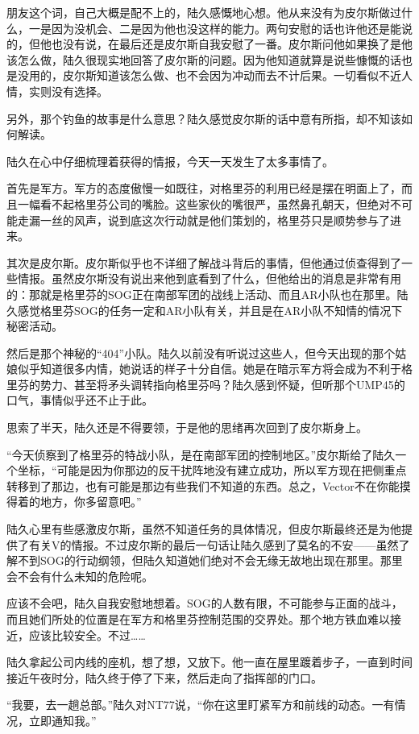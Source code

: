 朋友这个词，自己大概是配不上的，陆久感慨地心想。他从来没有为皮尔斯做过什么，一是因为没机会、二是因为他也没这样的能力。两句安慰的话也许他还是能说的，但他也没有说，在最后还是皮尔斯自我安慰了一番。皮尔斯问他如果换了是他该怎么做，陆久很现实地回答了皮尔斯的问题。因为他知道就算是说些慷慨的话也是没用的，皮尔斯知道该怎么做、也不会因为冲动而去不计后果。一切看似不近人情，实则没有选择。

另外，那个钓鱼的故事是什么意思？陆久感觉皮尔斯的话中意有所指，却不知该如何解读。

陆久在心中仔细梳理着获得的情报，今天一天发生了太多事情了。

首先是军方。军方的态度傲慢一如既往，对格里芬的利用已经是摆在明面上了，而且一幅看不起格里芬公司的嘴脸。这些家伙的嘴很严，虽然鼻孔朝天，但绝对不可能走漏一丝的风声，说到底这次行动就是他们策划的，格里芬只是顺势参与了进来。

其次是皮尔斯。皮尔斯似乎也不详细了解战斗背后的事情，但他通过侦查得到了一些情报。虽然皮尔斯没有说出来他到底看到了什么，但他给出的消息是非常有用的：那就是格里芬的SOG正在南部军团的战线上活动、而且AR小队也在那里。陆久感觉格里芬SOG的任务一定和AR小队有关，并且是在AR小队不知情的情况下秘密活动。

然后是那个神秘的“404”小队。陆久以前没有听说过这些人，但今天出现的那个姑娘似乎知道很多内情，她说话的样子十分自信。她是在暗示军方将会成为不利于格里芬的势力、甚至将矛头调转指向格里芬吗？陆久感到怀疑，但听那个UMP45的口气，事情似乎还不止于此。

思索了半天，陆久还是不得要领，于是他的思绪再次回到了皮尔斯身上。

“今天侦察到了格里芬的特战小队，是在南部军团的控制地区。”皮尔斯给了陆久一个坐标，“可能是因为你那边的反干扰阵地没有建立成功，所以军方现在把侧重点转移到了那边，也有可能是那边有些我们不知道的东西。总之，Vector不在你能摸得着的地方，你多留意吧。”

陆久心里有些感激皮尔斯，虽然不知道任务的具体情况，但皮尔斯最终还是为他提供了有关V的情报。不过皮尔斯的最后一句话让陆久感到了莫名的不安——虽然了解不到SOG的行动纲领，但陆久知道她们绝对不会无缘无故地出现在那里。那里会不会有什么未知的危险呢。

应该不会吧，陆久自我安慰地想着。SOG的人数有限，不可能参与正面的战斗，而且她们所处的位置是在军方和格里芬控制范围的交界处。那个地方铁血难以接近，应该比较安全。不过……

陆久拿起公司内线的座机，想了想，又放下。他一直在屋里踱着步子，一直到时间接近午夜时分，陆久终于停了下来，然后走向了指挥部的门口。

“我要，去一趟总部。”陆久对NT77说，“你在这里盯紧军方和前线的动态。一有情况，立即通知我。”

